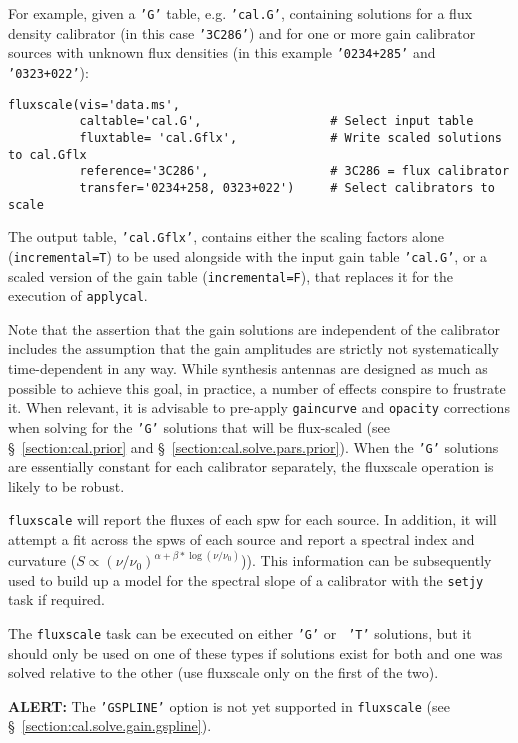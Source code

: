 For example, given a {\tt 'G'} table, e.g. {\tt 'cal.G'},
containing solutions for a flux density calibrator (in this case 
{\tt '3C286'}) and for one or more gain calibrator sources with
unknown flux densities (in this example {\tt '0234+285'} and 
{\tt '0323+022'}):
\small
\begin{verbatim}
fluxscale(vis='data.ms',
          caltable='cal.G',                  # Select input table
          fluxtable= 'cal.Gflx',             # Write scaled solutions to cal.Gflx
          reference='3C286',                 # 3C286 = flux calibrator
          transfer='0234+258, 0323+022')     # Select calibrators to scale
\end{verbatim}
\normalsize


The output table, {\tt 'cal.Gflx'}, contains either the scaling
factors alone ({\tt incremental=T}) to be used alongside with the
input gain table {\tt 'cal.G'}, or a scaled version of the gain table
({\tt incremental=F}), that replaces it for the execution of {\tt applycal}.


Note that the assertion that the gain solutions are independent of the
calibrator includes the assumption that the gain amplitudes are
strictly not systematically time-dependent in any way.  While synthesis antennas
are designed as much as possible to achieve this goal, in practice, a
number of effects conspire to frustrate it.  When relevant, it is
advisable to pre-apply {\tt gaincurve} and {\tt opacity} 
corrections when solving
for the {\tt 'G'} solutions that will be flux-scaled (see 
\S~\ref{section:cal.prior} and \S~\ref{section:cal.solve.pars.prior}).
When the {\tt 'G'} solutions are essentially constant for each
calibrator separately, the fluxscale operation is likely to be robust.

{\tt fluxscale} will report the fluxes of each spw for each source. In
addition, it will attempt a fit across the spws of each source and
report a spectral index and curvature
($S\propto(\nu/\nu_0)^{\alpha+\beta*\log(\nu/\nu_0)}$)). This
information can be subsequently used to build up a model for the
spectral slope of a calibrator with the {\tt setjy} task if required. 

The {\tt fluxscale} task can be executed on either {\tt 'G'} or {\tt
'T'} solutions, but it should only be used on one of these types if
solutions exist for both and one was solved relative to the other (use
fluxscale only on the first of the two).  

{\bf ALERT:} The {\tt 'GSPLINE'} option is not yet supported in
{\tt fluxscale} (see \S~\ref{section:cal.solve.gain.gspline}).

